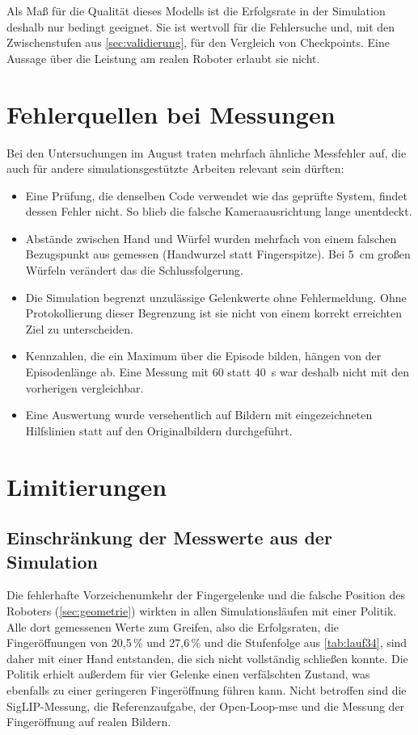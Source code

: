 Als Maß für die Qualität dieses Modells ist die Erfolgsrate in der Simulation
deshalb nur bedingt geeignet. Sie ist wertvoll für die Fehlersuche und, mit
den Zwischenstufen aus \cref{sec:validierung}, für den Vergleich von
Checkpoints. Eine Aussage über die Leistung am realen Roboter erlaubt sie
nicht.

\section{Fehlerquellen bei Messungen}
\label{sec:messartefakte}

Bei den Untersuchungen im August traten mehrfach ähnliche Messfehler auf, die
auch für andere simulationsgestützte Arbeiten relevant sein dürften:

\begin{itemize}
  \item Eine Prüfung, die denselben Code verwendet wie das geprüfte System,
    findet dessen Fehler nicht. So blieb die falsche Kameraausrichtung lange
    unentdeckt.
  \item Abstände zwischen Hand und Würfel wurden mehrfach von einem falschen
    Bezugspunkt aus gemessen (Handwurzel statt Fingerspitze). Bei 5~cm großen
    Würfeln verändert das die Schlussfolgerung.
  \item Die Simulation begrenzt unzulässige Gelenkwerte ohne Fehlermeldung.
    Ohne Protokollierung dieser Begrenzung ist sie nicht von einem korrekt
    erreichten Ziel zu unterscheiden.
  \item Kennzahlen, die ein Maximum über die Episode bilden, hängen von der
    Episodenlänge ab. Eine Messung mit 60 statt 40~s war deshalb nicht mit den
    vorherigen vergleichbar.
  \item Eine Auswertung wurde versehentlich auf Bildern mit eingezeichneten
    Hilfslinien statt auf den Originalbildern durchgeführt.
\end{itemize}

\section{Limitierungen}
\label{sec:limitierungen}

\subsection{Einschränkung der Messwerte aus der Simulation}
\label{sec:vorbehalt-greifzahlen}

Die fehlerhafte Vorzeichenumkehr der Fingergelenke und die falsche Position
des Roboters (\cref{sec:geometrie}) wirkten in allen Simulationsläufen mit
einer Politik. Alle dort gemessenen Werte zum Greifen, also die Erfolgsraten,
die Fingeröffnungen von 20,5\,\% und 27,6\,\% und die Stufenfolge aus
\cref{tab:lauf34}, sind daher mit einer Hand entstanden, die sich nicht
vollständig schließen konnte. Die Politik erhielt außerdem für vier Gelenke
einen verfälschten Zustand, was ebenfalls zu einer geringeren Fingeröffnung
führen kann. Nicht betroffen sind die SigLIP-Messung, die Referenzaufgabe,
der Open-Loop-\ac{mse} und die Messung der Fingeröffnung auf realen Bildern.


